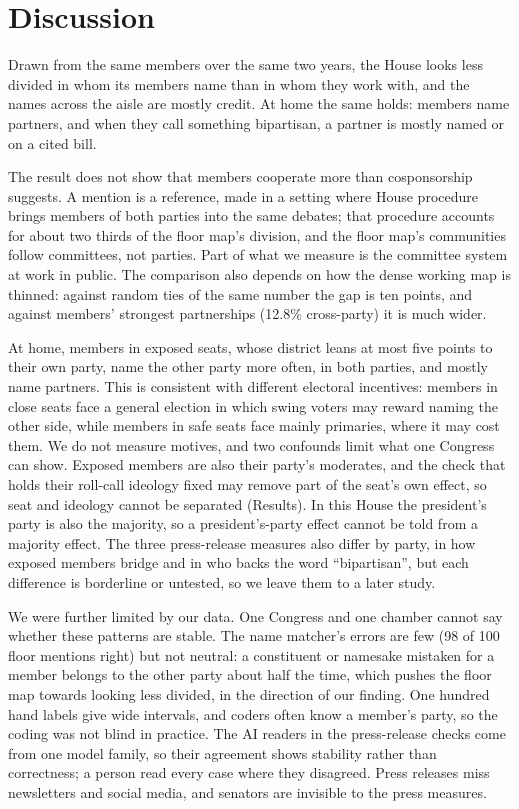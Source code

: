 \documentclass[9pt,twocolumn,twoside]{pnas-new}
\begin{document}
\section*{Discussion}

Drawn from the same members over the same two years, the House looks less divided in whom its members name than in
whom they work with, and the names across the aisle are mostly credit. At home the same holds: members name partners,
and when they call something bipartisan, a partner is mostly named or on a cited bill.

The result does not show that members cooperate more than cosponsorship suggests. A mention is a reference, made in a
setting where House procedure brings members of both parties into the same debates; that procedure accounts for about
two thirds of the floor map's division, and the floor map's communities follow committees, not parties. Part of what
we measure is the committee system at work in public. The comparison also depends on how the dense working map is
thinned: against random ties of the same number the gap is ten points, and against members' strongest partnerships
(12.8\% cross-party) it is much wider.

At home, members in exposed seats, whose district leans at most five points to their own party, name the other party
more often, in both parties, and mostly name partners. This is consistent with different electoral incentives:
members in close seats face a general election in which swing voters may reward naming the other side, while members
in safe seats face mainly primaries, where it may cost them. We do not measure motives, and two confounds limit what
one Congress can show. Exposed members are also their party's moderates, and the check that holds their roll-call
ideology fixed may remove part of the seat's own effect, so seat and ideology cannot be separated (Results). In this
House the president's party is also the majority, so a president's-party effect cannot be told from a majority
effect. The three press-release measures also differ by party, in how exposed members bridge and in who backs the
word ``bipartisan'', but each difference is borderline or untested, so we leave them to a later study.

We were further limited by our data. One Congress and one chamber cannot say whether these patterns are stable. The
name matcher's errors are few (98 of 100 floor mentions right) but not neutral: a constituent or namesake mistaken for
a member belongs to the other party about half the time, which pushes the floor map towards looking less divided, in
the direction of our finding. One hundred hand labels give wide intervals, and coders often know a member's party, so
the coding was not blind in practice. The AI readers in the press-release checks come from one model family, so their
agreement shows stability rather than correctness; a person read every case where they disagreed. Press releases miss
newsletters and social media, and senators are invisible to the press measures.
\end{document}
